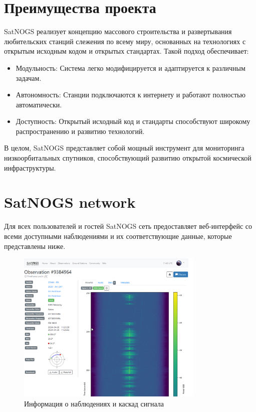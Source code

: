 \documentclass[14pt, a4paper]{../cls/coursework}
\begin{document}
    \section{Преимущества проекта}

    SatNOGS реализует концепцию массового строительства и развертывания любительских станций слежения по всему миру, основанных на технологиях с открытым исходным кодом и открытых стандартах.
    Такой подход обеспечивает:

    \begin{itemize}[label=\textbullet]
        \item    Модульность: Система легко модифицируется и адаптируется к различным задачам.
        \item    Автономность: Станции подключаются к интернету и работают полностью автоматически.
        \item    Доступность: Открытый исходный код и стандарты способствуют широкому распространению и развитию технологий.
    \end{itemize}

    В целом, SatNOGS представляет собой мощный инструмент для мониторинга низкоорбитальных спутников, способствующий развитию открытой космической инфраструктуры.

    \section{SatNOGS network}

    Для всех пользователей и гостей SatNOGS сеть предоставляет веб-интерфейс со всеми доступными наблюдениями и их соответствующие данные, которые представлены ниже.

    \begin{figure}[htbp]
        \centering
        \includegraphics[width=0.8\textwidth]{satnogs_observation_example}
        \caption{Информация о наблюдениях и каскад сигнала}
        \label{fig:satnogs_observation_example}
    \end{figure}
\end{document}
